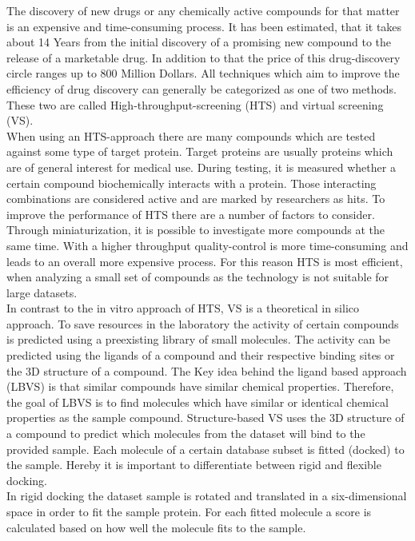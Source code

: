 The discovery of new drugs or any chemically active compounds for that matter is an expensive and 
time-consuming process. It has been estimated, that it takes about 14 Years from the initial
discovery of a promising new compound to the release of a marketable drug\cite{Myers2001}. In 
addition to that the price of this drug-discovery circle ranges up to 800 Million Dollars\cite{DiMasi2003}.
All techniques which aim to improve the efficiency of drug discovery can generally be categorized as one of two methods. 
These two are called High-throughput-screening (HTS) and virtual screening (VS)\cite[]{Myers2001}.
\\
When using an HTS-approach there are many compounds which are tested 
against some type of target protein. Target proteins are usually proteins which are of general interest for medical use. During testing, it is measured whether 
a certain compound biochemically interacts with a protein. Those interacting combinations 
are considered active and are marked by researchers as hits. To improve the performance of HTS there are a number of
factors to consider. Through miniaturization, it is possible to investigate more compounds at the same time. 
With a higher throughput quality-control is more time-consuming and leads to an overall more expensive process.
For this reason HTS is most efficient, when analyzing a small set of compounds as the technology is not 
suitable for large datasets\cite{Mayr2008}.
\\
In contrast to the in vitro approach of HTS, VS is a theoretical in silico approach. To save resources in the laboratory 
the activity of certain compounds is predicted using a preexisting library of small molecules. 
The activity can be predicted using the ligands of a compound and their respective binding sites or the 3D structure of a compound.
The Key idea behind the ligand based approach (LBVS) is that similar compounds have similar chemical properties.
Therefore, the goal of LBVS is to find molecules which have similar or identical chemical properties as the sample compound\cite{Gimeno2019}.
Structure-based VS uses the 3D structure of a compound to predict which molecules from the dataset will bind to the provided sample.
Each molecule of a certain database subset is fitted (docked) to the sample.
Hereby it is important to differentiate between rigid and flexible docking\cite{Pagadala2017}.
\\
In rigid docking the dataset sample is rotated and translated in a six-dimensional space in order to fit the sample protein.
For each fitted molecule a score is calculated based on how well the molecule fits to the sample\cite{Lavecchia2013}.
